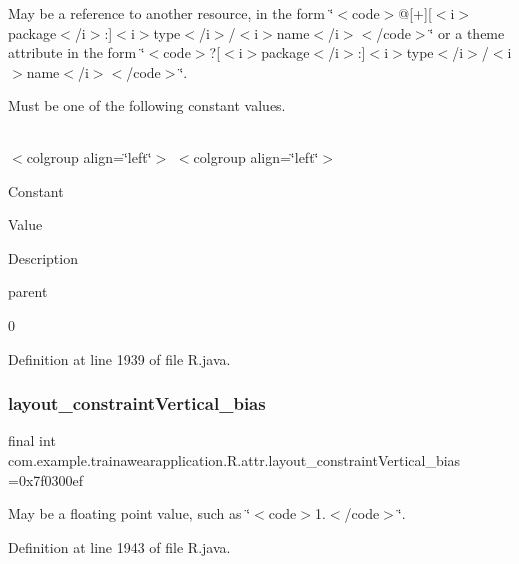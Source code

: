 May be a reference to another resource, in the form \char`\"{}$<$code$>$@\mbox{[}+\mbox{]}\mbox{[}$<$i$>$package$<$/i$>$\+:\mbox{]}$<$i$>$type$<$/i$>$/$<$i$>$name$<$/i$>$$<$/code$>$\char`\"{} or a theme attribute in the form \char`\"{}$<$code$>$?\mbox{[}$<$i$>$package$<$/i$>$\+:\mbox{]}$<$i$>$type$<$/i$>$/$<$i$>$name$<$/i$>$$<$/code$>$\char`\"{}. 

Must be one of the following constant values.

\tabulinesep=1mm
\begin{longtabu}spread 0pt [c]{*{0}{|X[-1]}|}
\hline
\end{longtabu}
$<$colgroup align=\char`\"{}left\char`\"{}$>$ $<$colgroup align=\char`\"{}left\char`\"{}$>$ 

Constant

Value

Description 

parent

0

Definition at line 1939 of file R.\+java.

\mbox{\label{classcom_1_1example_1_1trainawearapplication_1_1_r_1_1attr_adad59185c23683397d0a9bd010bc1ff4}} 
\subsubsection{\texorpdfstring{layout\_constraintVertical\_bias}{layout\_constraintVertical\_bias}}
{\footnotesize\ttfamily final int com.\+example.\+trainawearapplication.\+R.\+attr.\+layout\+\_\+constraint\+Vertical\+\_\+bias =0x7f0300ef\hspace{0.3cm}{\ttfamily [static]}}

May be a floating point value, such as \char`\"{}$<$code$>$1.$<$/code$>$\char`\"{}. 

Definition at line 1943 of file R.\+java.

\mbox{\label{classcom_1_1example_1_1trainawearapplication_1_1_r_1_1attr_abbd3aadd659e4175eaef3446d4df72fa}} 
